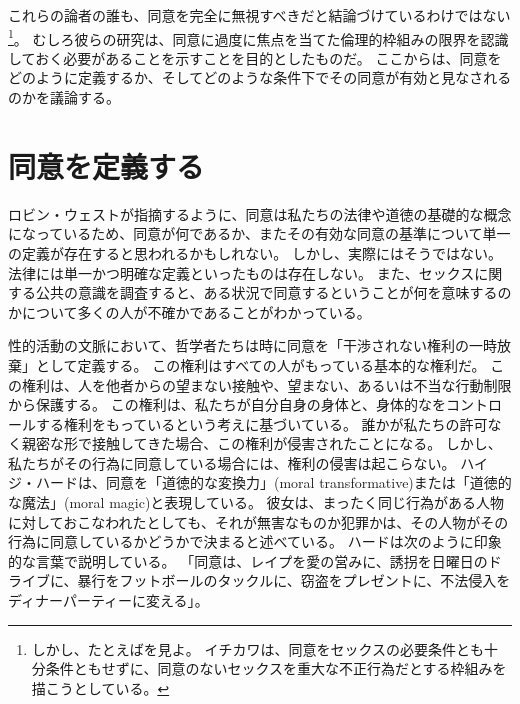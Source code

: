 \documentclass[paper=a4,book,openany]{jlreq}
\newcommand{\ig}[1]{}           %
\begin{document}
これらの論者の誰も、同意を完全に無視すべきだと結論づけているわけではない\footnote{しかし、たとえば\citet{ichikawa20:_presup_consen}を見よ。
イチカワは、同意をセックスの必要条件とも十分条件ともせずに、同意のないセックスを重大な不正行為だとする枠組みを描こうとしている。
\nocite{ichikawa20:_presup_consen}}。
むしろ彼らの研究は、同意に過度に焦点を当てた倫理的枠組みの限界を認識しておく必要があることを示すことを目的としたものだ。
ここからは、同意をどのように定義するか、そしてどのような条件下でその同意が有効と見なされるのかを議論する。

\section{同意を定義する}

ロビン・ウェスト\ig{Robin West}が指摘するように、同意は私たちの法律や道徳の基礎的な概念になっているため、同意が何であるか、またその有効な同意の基準について単一の定義が存在すると思われるかもしれない。
しかし、実際にはそうではない。
法律には単一かつ明確な定義といったものは存在しない。
また、セックスに関する公共の意識を調査すると、ある状況で同意するということが何を意味するのかについて多くの人が不確かであることがわかっている\citep[pp.462-463]{muehlenhard16:_compl_sexual_consen_colleg_studen}。

性的活動の文脈において、哲学者たちは時に同意を「干渉されない権利の一時放棄」として定義する。
この権利はすべての人がもっている基本的な権利だ。
この権利は、人を他者からの望まない接触や、望まない、あるいは不当な行動制限から保護する。
この権利は、私たちが自分自身の身体と、身体的なをコントロールする権利をもっているという考えに基づいている。
誰かが私たちの許可なく親密な形で接触してきた場合、この権利が侵害されたことになる。
しかし、私たちがその行為に同意している場合には、権利の侵害は起こらない。
ハイジ・ハードは、同意を「道徳的な変換力」(moral transformative)または「道徳的な魔法」(moral magic)と表現している。
彼女は、まったく同じ行為がある人物に対しておこなわれたとしても、それが無害なものか犯罪かは、その人物がその行為に同意しているかどうかで決まると述べている。
ハード\ig{Hurd}は次のように印象的な言葉で説明している。
「同意は、レイプを愛の営みに、誘拐を日曜日のドライブに、暴行をフットボールのタックルに、窃盗をプレゼントに、不法侵入をディナーパーティーに変える」\citep[pp.503-504]{hurd05:_blamin_victim}。
\end{document}
